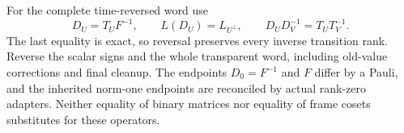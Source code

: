 For the complete time-reversed word use
\[
 D_U=T_UF^{-1},\qquad L(D_U)=L_{U^\perp},\qquad
 D_UD_V^{-1}=T_UT_V^{-1}.
\]
The last equality is exact, so reversal preserves every inverse transition
rank. Reverse the scalar signs and the whole transparent word, including
old-value corrections and final cleanup. The endpoints $D_0=F^{-1}$
and $F$ differ by a Pauli, and the inherited norm-one endpoints are
reconciled by actual rank-zero adapters. Neither equality of binary
matrices nor equality of frame cosets substitutes for these operators.
